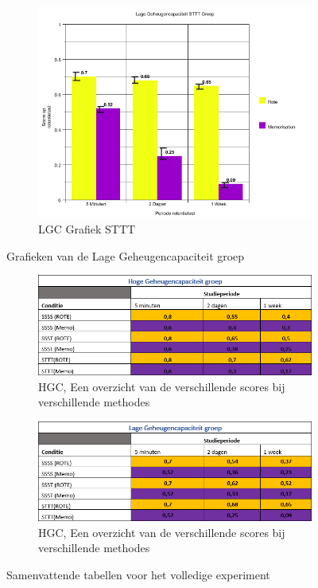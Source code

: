 \documentclass{hogent-article}
\begin{document}
\begin{figure}[H]
\begin{subfigure}{0.45\textwidth}
        \includegraphics[width=\linewidth]{graph6}
        \caption{LGC Grafiek STTT}
    \end{subfigure}
    \caption{Grafieken van de Lage Geheugencapaciteit groep}
\end{figure}
\begin{figure}[H]
    \begin{subfigure}{0.45\textwidth}
        \includegraphics[width=\linewidth]{table1}
        \caption{HGC, Een overzicht van de verschillende scores bij verschillende methodes }
    \end{subfigure}
    \begin{subfigure}{0.45\textwidth}
        \includegraphics[width=\linewidth]{table2}
        \caption{HGC, Een overzicht van de verschillende scores bij verschillende methodes}
    \end{subfigure}
    \caption{Samenvattende tabellen voor het volledige experiment}
\end{figure}
\end{document}
